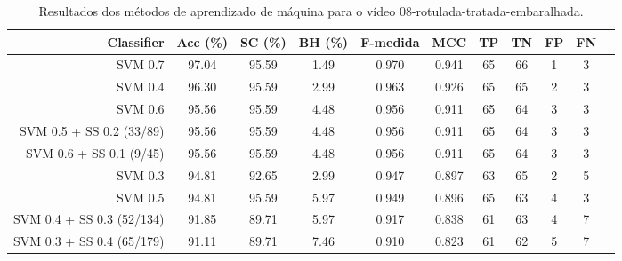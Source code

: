 \begin{table}[!htb]
\centering
\caption{Resultados dos métodos de aprendizado de máquina para o vídeo 08-rotulada-tratada-embaralhada.}
\label{tab:08-rotulada-tratada-embaralhada}
\begin{tabular}{r|c|c|c|c|c|c|c|c|c|c}
\hline\hline
Classifier & Acc (\%) & SC (\%) & BH (\%) & F-medida & MCC & TP & TN & FP & FN \\ \hline
SVM 0.7 & 97.04 & 95.59 & 1.49 & 0.970 & 0.941 & 65 & 66 & 1 & 3 \\ 
SVM 0.4 & 96.30 & 95.59 & 2.99 & 0.963 & 0.926 & 65 & 65 & 2 & 3 \\ 
SVM 0.6 & 95.56 & 95.59 & 4.48 & 0.956 & 0.911 & 65 & 64 & 3 & 3 \\ 
SVM 0.5 + SS 0.2 (33/89) & 95.56 & 95.59 & 4.48 & 0.956 & 0.911 & 65 & 64 & 3 & 3 \\ 
SVM 0.6 + SS 0.1 (9/45) & 95.56 & 95.59 & 4.48 & 0.956 & 0.911 & 65 & 64 & 3 & 3 \\ 
SVM 0.3 & 94.81 & 92.65 & 2.99 & 0.947 & 0.897 & 63 & 65 & 2 & 5 \\ 
SVM 0.5 & 94.81 & 95.59 & 5.97 & 0.949 & 0.896 & 65 & 63 & 4 & 3 \\ 
SVM 0.4 + SS 0.3 (52/134) & 91.85 & 89.71 & 5.97 & 0.917 & 0.838 & 61 & 63 & 4 & 7 \\ 
SVM 0.3 + SS 0.4 (65/179) & 91.11 & 89.71 & 7.46 & 0.910 & 0.823 & 61 & 62 & 5 & 7 \\ 
\hline\hline
\end{tabular}
\end{table}
